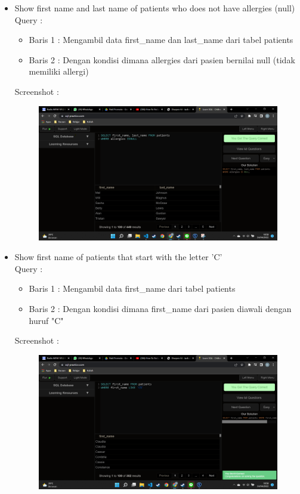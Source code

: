 \documentclass[]{article}
\begin{document}
\begin{itemize}
        \item Show first name and last name of patients who does not have allergies (null)
        \\Query :
        
        \begin{itemize}
            \item Baris 1 : Mengambil data first\_name dan last\_name dari tabel patients
            \item Baris 2 : Dengan kondisi dimana allergies dari pasien bernilai null (tidak memiliki allergi)
        \end{itemize}
        Screenshot :
        \begin{figure}[h]
            \includegraphics[scale=0.3]{./Screenshot/Easy-2.png}
            \centering
        \end{figure}

        \item Show first name of patients that start with the letter 'C'
        \\Query :
        
        \begin{itemize}
            \item Baris 1 : Mengambil data first\_name dari tabel patients
            \item Baris 2 : Dengan kondisi dimana first\_name dari pasien diawali dengan huruf "C" 
        \end{itemize}
        \pagebreak
        Screenshot :
        \begin{figure}[h]
            \includegraphics[scale=0.3]{./Screenshot/Easy-3.png}
            \centering
        \end{figure}


\end{itemize}
\end{document}
